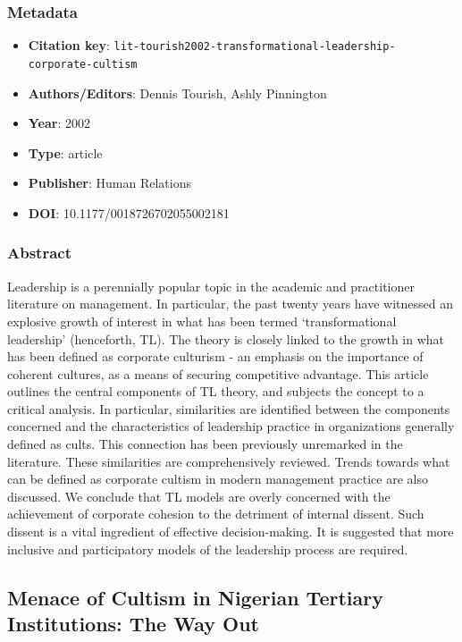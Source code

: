 \subsubsection*{Metadata}
\begin{itemize}
  \item \textbf{Citation key}: \texttt{lit-tourish2002-transformational-leadership-corporate-cultism}
  \item \textbf{Authors/Editors}: Dennis Tourish, Ashly Pinnington
  \item \textbf{Year}: 2002
  \item \textbf{Type}: article
  \item \textbf{Publisher}: Human Relations
  \item \textbf{DOI}: 10.1177/0018726702055002181
\end{itemize}
\subsubsection*{Abstract}
Leadership is a perennially popular topic in the academic and practitioner literature on management. In particular, the past twenty years have witnessed an explosive growth of interest in what has been termed ‘transformational leadership’ (henceforth, TL). The theory is closely linked to the growth in what has been defined as corporate culturism - an emphasis on the importance of coherent cultures, as a means of securing competitive advantage. This article outlines the central components of TL theory, and subjects the concept to a critical analysis. In particular, similarities are identified between the components concerned and the characteristics of leadership practice in organizations generally defined as cults. This connection has been previously unremarked in the literature. These similarities are comprehensively reviewed. Trends towards what can be defined as corporate cultism in modern management practice are also discussed. We conclude that TL models are overly concerned with the achievement of corporate cohesion to the detriment of internal dissent. Such dissent is a vital ingredient of effective decision-making. It is suggested that more inclusive and participatory models of the leadership process are required.

\subsection{Menace of Cultism in Nigerian Tertiary Institutions: The Way Out}\label{lit:lit-ajayi2010-menace-of-cultism-in}
